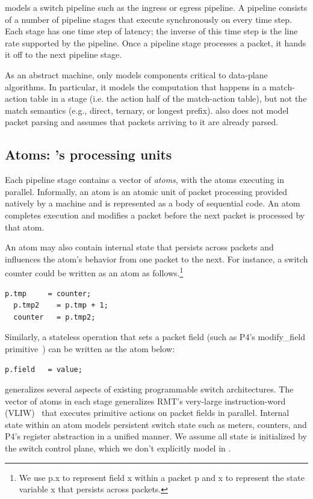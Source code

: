 \absmachine models a switch pipeline such as the ingress or egress pipeline. A
pipeline consists of a number of pipeline stages that execute synchronously on
every time step. Each stage has one time step of latency; the inverse of this
time step is the line rate supported by the pipeline. Once a pipeline stage
processes a packet, it hands it off to the next pipeline stage.

As an abstract machine, \absmachine only models components critical to
data-plane algorithms. In particular, it models the computation that happens in
a match-action table in a stage (i.e. the action half of the match-action
table), but not the match semantics (e.g., direct, ternary, or longest prefix).
\absmachine also does not model packet parsing and assumes that packets
arriving to it are already parsed.

\subsection{Atoms: \absmachine's processing units}

Each pipeline stage contains a vector of \textit{atoms}, with the atoms
executing in parallel. Informally, an atom is an atomic unit of packet
processing provided natively by a \absmachine machine and is represented as a
body of sequential code. An atom completes execution and modifies a packet before
the next packet is processed by that atom.

An atom may also contain internal state that persists across packets and
influences the atom's behavior from one packet to the next. For instance, a
switch counter could be written as an atom as follows.\footnote{We use
  p.x to represent field x within a packet p and x to represent
  the state variable x that persists across packets.}
  \begin{lstlisting}[style=customc]
  p.tmp     = counter;
  p.tmp2    = p.tmp + 1;
  counter   = p.tmp2;
  \end{lstlisting}
Similarly, a stateless operation that sets a packet field (such as P4's
modify\_field primitive~\cite{p4spec}) can be written as the atom
below:
\begin{lstlisting}[style=customc]
p.field   = value;
\end{lstlisting}

\absmachine generalizes several aspects of existing programmable switch
architectures. The vector of atoms in each stage generalizes RMT's very-large
instruction-word (VLIW)~\cite{rmt} that executes primitive actions on packet
fields in parallel. Internal state within an atom models persistent switch
state such as meters, counters, and P4's register abstraction in a unified
manner. We assume all state is initialized by the switch control plane, which
we don't explicitly model in \absmachine.

